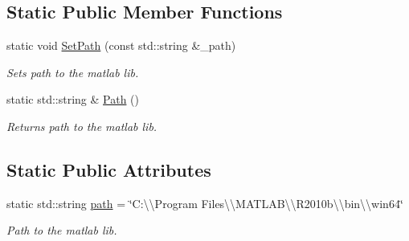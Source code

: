 \subsection*{Static Public Member Functions}
\begin{DoxyCompactItemize}
\item 
static void \hyperlink{class_c_m_a_t_l_a_b_a614b714e664e465bd541da7b26a26e59}{Set\-Path} (const std\-::string \&\-\_\-path)
\begin{DoxyCompactList}\small\item\em Sets path to the matlab lib. \end{DoxyCompactList}\item 
static std\-::string \& \hyperlink{class_c_m_a_t_l_a_b_ad72372f5293f1f2cb6bab38229313378}{Path} ()
\begin{DoxyCompactList}\small\item\em Returns path to the matlab lib. \end{DoxyCompactList}\end{DoxyCompactItemize}
\subsection*{Static Public Attributes}
\begin{DoxyCompactItemize}
\item 
static std\-::string \hyperlink{class_c_m_a_t_l_a_b_a3faf4011fa6f7bdd7281e0c5ad10a970}{path} = \char`\"{}C\-:\textbackslash{}\textbackslash{}\-Program Files\textbackslash{}\textbackslash{}\-M\-A\-T\-L\-A\-B\textbackslash{}\textbackslash{}\-R2010b\textbackslash{}\textbackslash{}bin\textbackslash{}\textbackslash{}win64\char`\"{}
\begin{DoxyCompactList}\small\item\em Path to the matlab lib. \end{DoxyCompactList}\end{DoxyCompactItemize}
